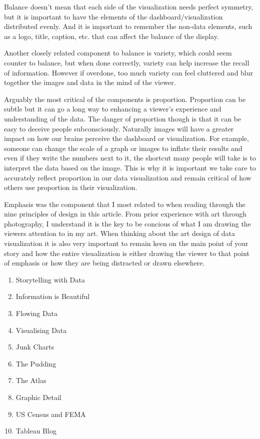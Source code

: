 \documentclass[]{book}
\providecommand{\tightlist}{%
  \setlength{\itemsep}{0pt}\setlength{\parskip}{0pt}}
\theoremstyle{definition}
\theoremstyle{definition}
\theoremstyle{definition}
\theoremstyle{remark}
\begin{document}
Balance doesn't mean that each side of the visualization needs perfect
symmetry, but it is important to have the elements of the
dashboard/visualization distributed evenly. And it is important to
remember the non-data elements, such as a logo, title, caption, etc.
that can affect the balance of the display.

Another closely related component to balance is variety, which could
seem counter to balance, but when done correctly, variety can help
increase the recall of information. However if overdone, too much
variety can feel cluttered and blur together the images and data in the
mind of the viewer.

Arguably the most critical of the components is proportion. Proportion
can be subtle but it can go a long way to enhancing a viewer's
experience and understanding of the data. The danger of proportion
though is that it can be easy to deceive people subconsciously.
Naturally images will have a greater impact on how our brains perceive
the dashboard or visualization. For example, someone can change the
scale of a graph or images to inflate their results and even if they
write the numbers next to it, the shortcut many people will take is to
interpret the data based on the image. This is why it is important we
take care to accurately reflect proportion in our data visualization and
remain critical of how others use proportion in their visualization.

Emphasis was the component that I most related to when reading through
the nine principles of design in this article. From prior experience
with art through photography, I understand it is the key to be concious
of what I am drawing the viewers attention to in my art. When thinking
about the art design of data visualization it is also very important to
remain keen on the main point of your story and how the entire
visualization is either drawing the viewer to that point of emphasis or
how they are being distracted or drawn elsewhere.

\citep{Top_10_Blogs}

\begin{enumerate}
\def\labelenumi{\arabic{enumi}.}
\tightlist
\item
  Storytelling with Data
\item
  Information is Beautiful
\item
  Flowing Data
\item
  Visualising Data
\item
  Junk Charts
\item
  The Pudding
\item
  The Atlas
\item
  Graphic Detail
\item
  US Census and FEMA
\item
  Tableau Blog
\end{enumerate}
\end{document}
